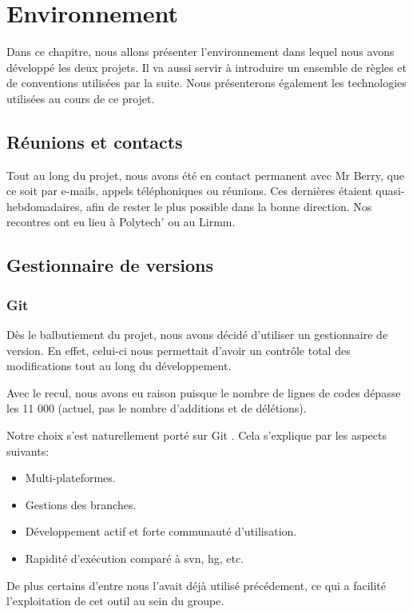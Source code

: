 \chapter{Environnement}

Dans ce chapitre, nous allons présenter l'environnement dans lequel nous avons
développé les deux projets. Il va aussi servir à introduire un ensemble de
règles et de conventions utilisées par la suite.
Nous présenterons également les technologies utilisées au cours de ce projet.


    \section{Réunions et contacts}
Tout au long du projet, nous avons été en contact permanent avec Mr Berry,
que ce soit par e-mails, appels téléphoniques ou réunions. Ces dernières
étaient quasi-hebdomadaires, afin de rester le plus possible dans la
bonne direction. Nos recontres ont eu lieu à Polytech' ou au Lirmm.

    \section{Gestionnaire de versions}

        \subsection{Git}
Dès le balbutiement du projet, nous avons décidé d'utiliser un gestionnaire
de version. En effet, celui-ci nous permettait d'avoir un contrôle total des modifications
tout au long du développement.

Avec le recul, nous avons eu raison puisque le nombre de lignes de codes dépasse 
les 11 000 (actuel, pas le nombre d'additions et de délétions).

Notre choix s'est naturellement porté sur Git \cite{git}. Cela s'explique 
par les aspects suivants:

    \begin{itemize}
    \item Multi-plateformes.
    \item Gestions des branches.
    \item Développement actif et forte communauté d'utilisation.
    \item Rapidité d'exécution comparé à svn, hg, etc. 
    \end{itemize}

    De plus certains d'entre nous l'avait déjà utilisé précédement, ce qui a facilité
    l'exploitation de cet outil au sein du groupe.
\newpage

